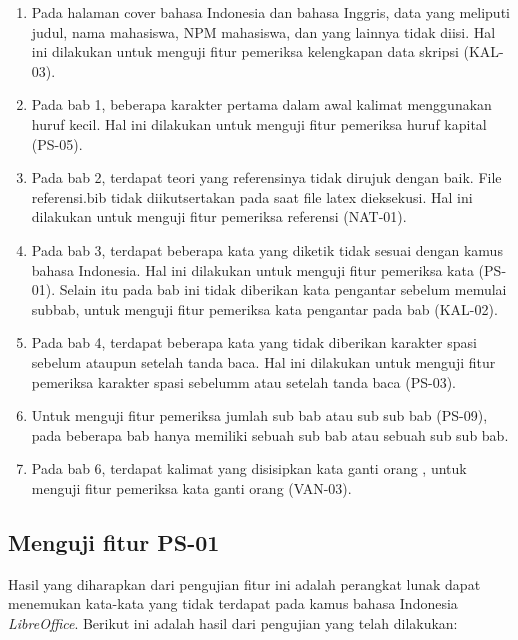 \begin{enumerate}
	\item Pada halaman cover bahasa Indonesia dan bahasa Inggris, data yang meliputi judul, nama mahasiswa, NPM mahasiswa, dan yang lainnya tidak diisi. Hal ini dilakukan untuk menguji fitur pemeriksa kelengkapan data skripsi (KAL-03).
	
	\item Pada bab 1, beberapa karakter pertama dalam awal kalimat menggunakan huruf kecil. Hal ini dilakukan untuk menguji fitur pemeriksa huruf kapital (PS-05).
	
	\item Pada bab 2, terdapat teori yang referensinya tidak dirujuk dengan baik. File referensi.bib tidak diikutsertakan pada saat file latex dieksekusi. Hal ini dilakukan untuk menguji fitur pemeriksa referensi (NAT-01).
	
	\item Pada bab 3, terdapat beberapa kata yang diketik tidak sesuai dengan kamus bahasa Indonesia. Hal ini dilakukan untuk menguji fitur pemeriksa kata (PS-01). Selain itu pada bab ini tidak diberikan kata pengantar sebelum memulai subbab, untuk menguji fitur pemeriksa kata pengantar pada bab (KAL-02).
	
	\item Pada bab 4, terdapat beberapa kata yang tidak diberikan karakter spasi sebelum ataupun setelah tanda baca. Hal ini dilakukan untuk menguji fitur pemeriksa karakter spasi sebelumm atau setelah tanda baca (PS-03).	

	\item Untuk menguji fitur pemeriksa jumlah sub bab atau sub sub bab (PS-09), pada beberapa bab hanya memiliki sebuah sub bab atau sebuah sub sub bab.
		
	\item Pada bab 6, terdapat kalimat yang disisipkan kata ganti orang , untuk menguji fitur pemeriksa kata ganti orang (VAN-03).
\end{enumerate}

\subsection{Menguji fitur PS-01}
Hasil yang diharapkan dari pengujian fitur ini adalah perangkat lunak dapat menemukan kata-kata yang tidak terdapat pada kamus bahasa Indonesia \textit{LibreOffice}. Berikut ini adalah hasil dari pengujian yang telah dilakukan:

